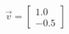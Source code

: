 \documentclass[preview]{standalone}
\begin{document}
\begin{align*}
\vec{v}=\begin{bmatrix}1.0\\-0.5\end{bmatrix}
\end{align*}
\end{document}
